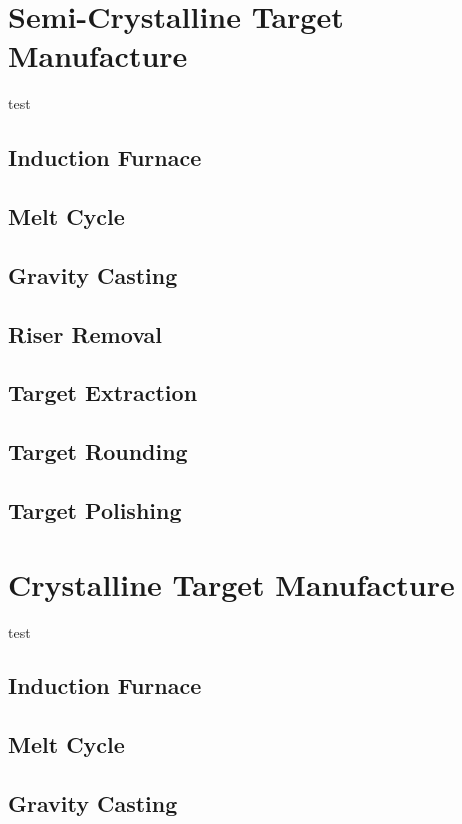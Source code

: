 \documentclass[a4paper,12pt,oneside]{report}%
\begin{document}
\section{Semi-Crystalline Target Manufacture} 
test
\subsection{Induction Furnace}

\subsection{Melt Cycle}

\subsection{Gravity Casting}

\subsection{Riser Removal} 

\subsection{Target Extraction}

\subsection{Target Rounding}

\subsection{Target Polishing}

\section{Crystalline Target Manufacture}
test
\subsection{Induction Furnace}

\subsection{Melt Cycle}

\subsection{Gravity Casting}
\end{document}
